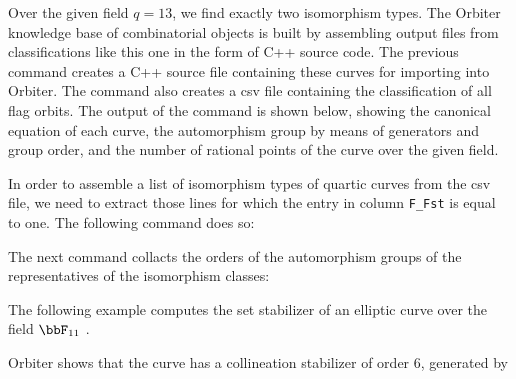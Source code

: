 
Over the given field $q=13$, we find exactly two isomorphism types. 
The Orbiter knowledge base of combinatorial objects is built by assembling output files 
from classifications like this one in the form of C++ source code. 
The previous command creates a C++ source file containing these curves for 
importing into Orbiter. 
The command also creates a csv file containing the classification of all flag orbits.
The output of the command is shown below, showing the canonical equation of each curve, 
the automorphism group by means of generators and group order, 
and the number of rational points of the curve over the given field.




\bigskip

In order to assemble a list of isomorphism types of quartic curves from the csv file, 
we need to extract those lines for which the entry in column \verb'F_Fst' is equal to one. 
The following command does so:


\bigskip

The next command collacts the orders of the automorphism groups of the representatives of the isomorphism classes:




\bigskip



The following example computes the set stabilizer 
of an elliptic curve over the field $\bbF_{11}$ .


Orbiter shows that the curve has a collineation stabilizer of order 6, 
generated by 

\bigskip


